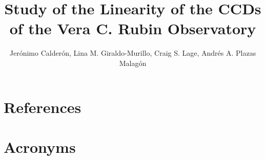 \documentclass[OPS,authoryear,toc]{lsstdoc}
\title{Study of the Linearity of the CCDs of the Vera C. Rubin Observatory}
\author{%
Jerónimo Calderón, Lina M. Giraldo-Murillo, Craig S. Lage, Andrés A. Plazas Malagón
}
\date{\vcsDate}
\begin{document}
\maketitle




\appendix
\section{References} \label{sec:bib}
\renewcommand{\refname}{} %


\section{Acronyms} \label{sec:acronyms}

\end{document}
